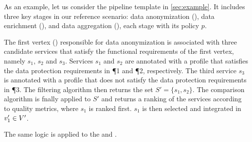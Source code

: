 \begin{example}\label{ex:instance}

  As an example, let us consider the pipeline template \tChartFunction in \cref{sec:example}.
  It includes three key stages in our reference scenario: data anonymization (), data enrichment (), and data aggregation (), each stage with its policy $p$.

  The first vertex () responsible for data anonymization is associated with three candidate services that satisfy the functional requirements of the first vertex, namely $s_1$, $s_2$ and $s_3$.
  Services $s_1$ and $s_2$ are annotated with a profile that satisfies the data protection requirements in \P{1} and \P{2}, respectively.
  The third service $s_3$ is annotated with a profile that does not satisfy the data protection requirements in \P{3}.
  The filtering algorithm then returns the set $S'=\{s_1,s_2\}$.
  The comparison algorithm is fnally applied to $S'$ and returns a ranking of the services according to quality metrics, where $s_1$ is ranked first. $s_1$ is then selected and integrated in $v'_{1}\in V'$. 
  
  The same logic is applied to the  and .

\end{example}







